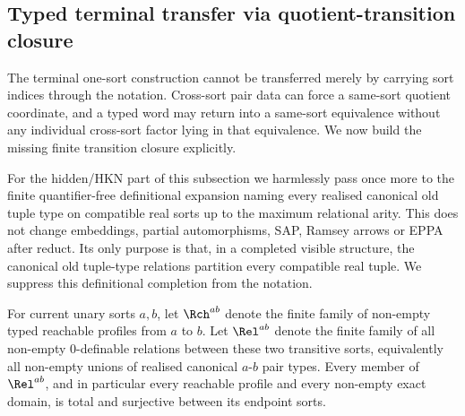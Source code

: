 \subsection{Typed terminal transfer via quotient-transition closure}

The terminal one-sort construction cannot be transferred merely by carrying
sort indices through the notation.  Cross-sort pair data can force a same-sort
quotient coordinate, and a typed word may return into a same-sort equivalence
without any individual cross-sort factor lying in that equivalence.  We now
build the missing finite transition closure explicitly.

For the hidden/HKN part of this subsection we harmlessly pass once more to the
finite quantifier-free definitional expansion naming every realised canonical
old tuple type on compatible real sorts up to the maximum relational arity.
This does not change embeddings, partial automorphisms, SAP, Ramsey arrows or
EPPA after reduct.  Its only purpose is that, in a completed visible
structure, the canonical old tuple-type relations partition every compatible
real tuple.  We suppress this definitional completion from the notation.

For current unary sorts \(a,b\), let \(\Rch^{ab}\) denote the finite family of
non-empty typed reachable profiles from \(a\) to \(b\).  Let
\(\Rel^{ab}\) denote the finite family of all non-empty \(0\)-definable
relations between these two transitive sorts, equivalently all non-empty
unions of realised canonical \(a\)-\(b\) pair types.  Every member of
\(\Rel^{ab}\), and in particular every reachable profile and every non-empty
exact domain, is total and surjective between its endpoint sorts.

